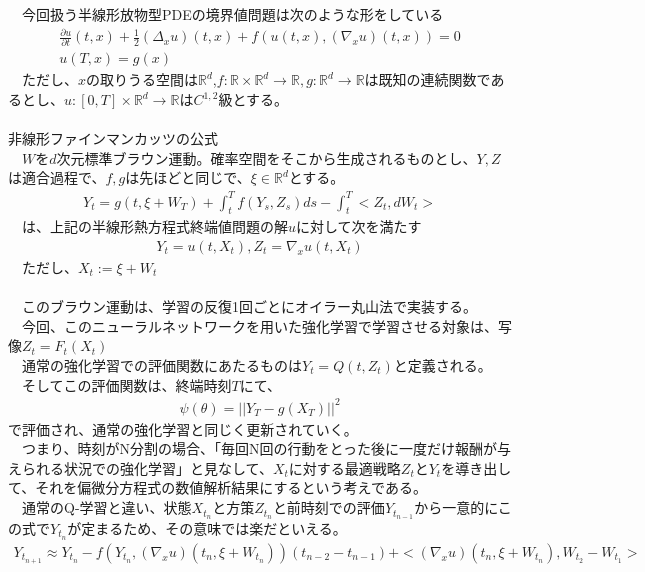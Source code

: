 \documentclass{jsarticle}
\begin{document}
　今回扱う半線形放物型PDEの境界値問題は次のような形をしている\\
\begin{eqnarray}
\frac{\partial u}{\partial t}(t,x)+\frac{1}{2}(\Delta_xu)(t,x)+f(u(t,x),(\nabla_xu)(t,x))=0\\
u(T,x)=g(x)
\end{eqnarray}
　ただし、$x$の取りうる空間は$\mathbb{R}^d$,$f:\mathbb{R}\times\mathbb{R}^d\rightarrow \mathbb{R},g:\mathbb{R}^d\rightarrow\mathbb{R}$は既知の連続関数であるとし、$u:[0,T]\times\mathbb{R}^d\rightarrow \mathbb{R}$は$C^{1,2}$級とする。\\
　\\
非線形ファインマンカッツの公式\\
　$W$を$d$次元標準ブラウン運動。確率空間をそこから生成されるものとし、$Y,Z$は適合過程で、$f,g$は先ほどと同じで、$\xi\in\mathbb{R}^d$とする。
\begin{eqnarray}
Y_t=g(t,\xi+W_T)+\int^T_tf(Y_s,Z_s)ds-\int^T_t<Z_t,dW_t>
\end{eqnarray}
　は、上記の半線形熱方程式終端値問題の解$u$に対して次を満たす
\begin{eqnarray}
Y_t=u(t,X_t),Z_t=\nabla_xu(t,X_t)
\end{eqnarray}
　ただし、$X_t:=\xi+W_t$\\
　\\
　このブラウン運動は、学習の反復1回ごとにオイラー丸山法で実装する。\\
　今回、このニューラルネットワークを用いた強化学習で学習させる対象は、写像$Z_t=F_t(X_t)$\\
　通常の強化学習での評価関数にあたるものは$Y_t=Q(t,Z_t)$と定義される。\\
　そしてこの評価関数は、終端時刻$T$にて、
\begin{eqnarray}
\psi(\theta)=||Y_T-g(X_T)||^2
\end{eqnarray}
 で評価され、通常の強化学習と同じく更新されていく。\\
　つまり、時刻がN分割の場合、「毎回N回の行動をとった後に一度だけ報酬が与えられる状況での強化学習」と見なして、$X_t$に対する最適戦略$Z_t$と$Y_t$を導き出して、それを偏微分方程式の数値解析結果にするという考えである。\\
　通常のQ-学習と違い、状態$X_{t_n}$と方策$Z_{t_n}$と前時刻での評価$Y_{t_{n-1}}$から一意的にこの式で$Y_{t_n}$が定まるため、その意味では楽だといえる。\\
\begin{eqnarray}
Y_{t_{n+1}}\approx Y_{t_n}-f(Y_{t_n},(\nabla_xu)(t_n,\xi+W_{t_n}))(t_{n-2}-t_{n-1})+<(\nabla_xu)(t_n,\xi+W_{t_n}),W_{t_2}-W_{t_1}>
\end{eqnarray}
\end{document}
